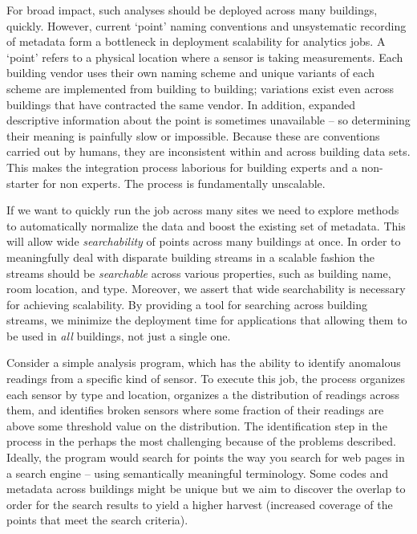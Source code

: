 For broad impact, such analyses should be deployed across many buildings, quickly. 
However, current `point' naming conventions and unsystematic recording of metadata form a 
bottleneck in deployment scalability for analytics jobs.  A `point' refers to a 
physical location where a sensor is taking measurements. 
Each building vendor uses their own naming scheme and
unique variants of each scheme are implemented from building to building; variations exist
even across buildings that have contracted the same vendor.
In addition, expanded descriptive information about the point is sometimes unavailable 
-- so determining their meaning is painfully slow or impossible.  
Because these are conventions carried
out by humans, they are inconsistent within and across building data sets.
This makes the integration process laborious for building experts and a non-starter for 
non experts.  The process is fundamentally unscalable. 

If we want to quickly run the job across many sites we need
to explore methods to automatically normalize the data and boost the
existing set of metadata.  This will allow wide \emph{searchability} of points across
many buildings at once.
In order to meaningfully deal with disparate building streams in a scalable 
fashion the streams should be \emph{searchable} across various properties, such
as building name, room location, and type.  Moreover, we
assert that wide searchability is necessary for achieving scalability.  By providing a tool for
searching across building streams, we minimize the deployment time for applications that 
allowing them to be used in \emph{all} buildings, not just a single one.  

Consider a simple analysis program, which has the ability
to identify anomalous readings from a specific kind of sensor. To execute this job, 
the process organizes each sensor by type and location, organizes a the distribution of
readings across them, and identifies broken sensors where some fraction of
their readings are above some threshold value on the distribution.
The identification step in the process in the perhaps the most challenging 
because of the problems described.  Ideally, the program would search for points the
way you search for web pages in a search engine -- using semantically meaningful 
terminology. Some codes and metadata across buildings might be unique but we aim 
to discover the overlap to order for the search results to yield a higher harvest
(increased coverage of the points that meet the search criteria).


